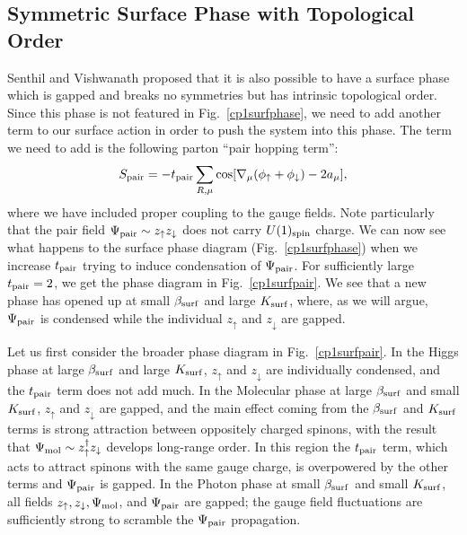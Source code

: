 \documentclass[prb,twocolumn]{revtex4-1}
\begin{document}
\subsection{Symmetric Surface Phase with Topological Order}
Senthil and Vishwanath proposed that it is also possible to have a surface phase which is gapped and breaks no symmetries but has intrinsic topological order.\cite{SenthilVishwanath} Since this phase is not featured in Fig.~\ref{cp1surfphase}, we need to add another term to our surface action in order to push the system into this phase. The term we need to add is the following parton ``pair hopping term'':\cite{SenthilVishwanath, Max}
\begin{equation}
S_{\rm pair} = -t_{\rm pair}\sum_{R,\mu} \cos[\nabla_\mu (\phi_\uparrow + \phi_\downarrow) - 2 a_\mu],
\label{pairing}
\end{equation}
where we have included proper coupling to the gauge fields.  Note particularly that the pair field $\Psi_{\rm pair} \sim z_\uparrow z_\downarrow$ does not carry $U(1)_{\rm spin}$ charge. 
We can now see what happens to the surface phase diagram (Fig.~\ref{cp1surfphase}) when we increase $t_{\rm pair}$ trying to induce condensation of $\Psi_{\rm pair}$.  For sufficiently large $t_{\rm pair}=2$, we get the phase diagram in Fig.~\ref{cp1surfpair}.  We see that a new phase has opened up at small $\beta_{\rm surf}$ and large $K_{\rm surf}$, where, as we will argue, $\Psi_{\rm pair}$ is condensed while the individual $z_\uparrow$ and $z_\downarrow$ are gapped.

Let us first consider the broader phase diagram in Fig.~\ref{cp1surfpair}.  In the Higgs phase at large $\beta_{\rm surf}$ and large $K_{\rm surf}$, $z_\uparrow$ and $z_\downarrow$ are individually condensed, and the $t_{\rm pair}$ term does not add much.  In the Molecular phase at large $\beta_{\rm surf}$ and small $K_{\rm surf}$, $z_\uparrow$ and $z_\downarrow$ are gapped, and the main effect coming from the $\beta_{\rm surf}$ and $K_{\rm surf}$ terms is strong attraction between oppositely charged spinons, with the result that $\Psi_{\rm mol} \sim z_\uparrow^\dagger z_\downarrow$ develops long-range order.  In this region the $t_{\rm pair}$ term, which acts to attract spinons with the same gauge charge, is overpowered by the other terms and $\Psi_{\rm pair}$ is gapped.  In the Photon phase at small $\beta_{\rm surf}$ and small $K_{\rm surf}$, all fields $z_\uparrow, z_\downarrow, \Psi_{\rm mol}$, and $\Psi_{\rm pair}$ are gapped; the gauge field fluctuations are sufficiently strong to scramble the $\Psi_{\rm pair}$ propagation.  
\end{document}
